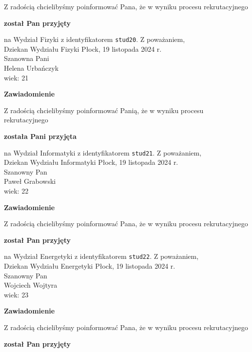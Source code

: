 \documentclass[12pt,a4paper]{article}
\begin{document}
\bigskip 
Z radością chcielibyśmy poinformować Pana, że w wyniku procesu rekrutacyjnego
\begin{center}
\textsf{\textbf{został Pan przyjęty}}
\end{center}
na Wydział Fizyki z identyfikatorem \verb|stud20|. 
\vspace{2cm}
\noindent
Z poważaniem, \\
Dziekan
Wydziału Fizyki
\newpage
\hfill Płock, 19 listopada 2024 r. \\
\noindent
Szanowna Pani \\
Helena Urbańczyk \\
wiek: 21
\bigskip
\begin{center}
    {\Large\textbf{Zawiadomienie}}
\end{center}
\bigskip 
Z radością chcielibyśmy poinformować Panią, że w wyniku procesu rekrutacyjnego
\begin{center}
\textsf{\textbf{została Pani przyjęta}}
\end{center}
na Wydział Informatyki z identyfikatorem \verb|stud21|. 
\vspace{2cm}
\noindent
Z poważaniem, \\
Dziekan
Wydziału Informatyki
\newpage
\hfill Płock, 19 listopada 2024 r. \\
\noindent
Szanowny Pan \\
Paweł Grabowski \\
wiek: 22
\bigskip
\begin{center}
    {\Large\textbf{Zawiadomienie}}
\end{center}
\bigskip 
Z radością chcielibyśmy poinformować Pana, że w wyniku procesu rekrutacyjnego
\begin{center}
\textsf{\textbf{został Pan przyjęty}}
\end{center}
na Wydział Energetyki z identyfikatorem \verb|stud22|. 
\vspace{2cm}
\noindent
Z poważaniem, \\
Dziekan
Wydziału Energetyki
\newpage
\hfill Płock, 19 listopada 2024 r. \\
\noindent
Szanowny Pan \\
Wojciech Wojtyra \\
wiek: 23
\bigskip
\begin{center}
    {\Large\textbf{Zawiadomienie}}
\end{center}
\bigskip 
Z radością chcielibyśmy poinformować Pana, że w wyniku procesu rekrutacyjnego
\begin{center}
\textsf{\textbf{został Pan przyjęty}}
\end{center}
\end{document}
